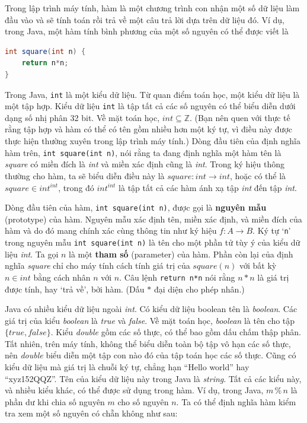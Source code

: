 Trong lập trình máy tính, hàm là một chương trình con nhận một số dữ liệu làm đầu vào và sẽ tính toán rồi trả về một câu trả lời dựa trên dữ liệu đó. Ví dụ, trong Java, một hàm tính bình phương của một số nguyên có thể được viết là

\begin{lstlisting}[language=Java]
int square(int n) {
    return n*n;
}
\end{lstlisting}

Trong Java, \texttt{int} là một kiểu dữ liệu. Từ quan điểm toán học, một kiểu dữ liệu là một tập hợp. Kiểu dữ liệu \texttt{int} là tập tất cả các số nguyên có thể biểu diễn dưới dạng số nhị phân 32 bit. Về mặt toán học, $\mathit{int} \subseteq \mathbb{Z}$. (Bạn nên quen với thực tế rằng tập hợp và hàm có thể có tên gồm nhiều hơn một ký tự, vì điều này được thực hiện thường xuyên trong lập trình máy tính.) Dòng đầu tiên của định nghĩa hàm trên, \texttt{int square(int n)}, nói rằng ta đang định nghĩa một hàm tên là \textit{square} có miền đích là \textit{int} và miền xác định cũng là \textit{int}. Trong ký hiệu thông thường cho hàm, ta sẽ biểu diễn điều này là $\mathit{square}\colon \mathit{int} \to \mathit{int}$, hoặc có thể là $\mathit{square} \in \mathit{int}^{\mathit{int}}$, trong đó $\mathit{int}^{\mathit{int}}$ là tập tất cả các hàm ánh xạ tập \textit{int} đến tập \textit{int}.

Dòng đầu tiên của hàm, \texttt{int square(int n)}, được gọi là \textbf{nguyên mẫu} (prototype) của hàm. Nguyên mẫu xác định tên, miền xác định, và miền đích của hàm và do đó mang chính xác cùng thông tin như ký hiệu $f\colon A \to B$. Ký tự `\texttt{n}' trong nguyên mẫu \texttt{int square(int n)} là tên cho một phần tử tùy ý của kiểu dữ liệu \textit{int}. Ta gọi $n$ là một \textbf{tham số} (parameter) của hàm. Phần còn lại của định nghĩa \textit{square} chỉ cho máy tính cách tính giá trị của $\mathit{square}(n)$ với bất kỳ $n \in \mathit{int}$ bằng cách nhân $n$ với $n$. Câu lệnh \texttt{return n*n} nói rằng $n * n$ là giá trị được tính, hay `trả về', bởi hàm. (Dấu $*$ đại diện cho phép nhân.)

Java có nhiều kiểu dữ liệu ngoài \textit{int}. Có kiểu dữ liệu boolean tên là \textit{boolean}. Các giá trị của kiểu \textit{boolean} là \textit{true} và \textit{false}. Về mặt toán học, \textit{boolean} là tên cho tập $\{\mathit{true}, \mathit{false}\}$. Kiểu \textit{double} gồm các số thực, có thể bao gồm dấu chấm thập phân. Tất nhiên, trên máy tính, không thể biểu diễn toàn bộ tập vô hạn các số thực, nên \textit{double} biểu diễn một tập con nào đó của tập toán học các số thực. Cũng có kiểu dữ liệu mà giá trị là chuỗi ký tự, chẳng hạn ``Hello world'' hay ``xyz152QQZ''. Tên của kiểu dữ liệu này trong Java là \textit{string}. Tất cả các kiểu này, và nhiều kiểu khác, có thể được sử dụng trong hàm. Ví dụ, trong Java, $m \mathbin{\%} n$ là phần dư khi chia số nguyên $m$ cho số nguyên $n$. Ta có thể định nghĩa hàm kiểm tra xem một số nguyên có chẵn không như sau:

